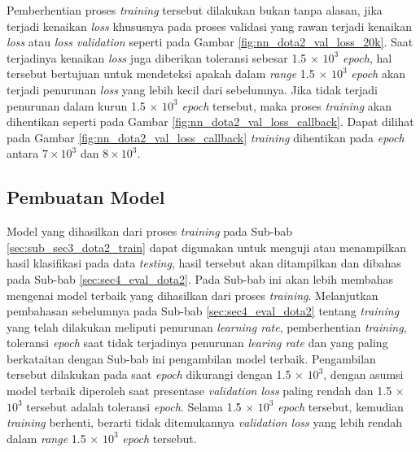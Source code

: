 Pemberhentian proses \textit{training} tersebut dilakukan bukan tanpa alasan, jika terjadi kenaikan \textit{loss} khususnya pada proses validasi yang rawan terjadi kenaikan \textit{loss} atau \textit{loss validation} seperti pada Gambar \ref{fig:nn_dota2_val_loss_20k}. Saat terjadinya kenaikan \textit{loss} juga diberikan toleransi sebesar 1.5 $\times$ $10^{3}$ \textit{epoch}, hal tersebut bertujuan untuk mendeteksi apakah dalam \textit{range} 1.5 $\times$ $10^{3}$ \textit{epoch} akan terjadi penurunan \textit{loss} yang lebih kecil dari sebelumnya. Jika tidak terjadi penurunan dalam kurun 1.5 $\times$ $10^{3}$ \textit{epoch} tersebut, maka proses \textit{training} akan dihentikan seperti pada Gambar \ref{fig:nn_dota2_val_loss_callback}. Dapat dilihat pada Gambar \ref{fig:nn_dota2_val_loss_callback} \textit{training} dihentikan pada \textit{epoch} antara $7 \times 10^{3}$ dan $8 \times 10^{3}$.
\vspace{1ex}

\subsection{Pembuatan Model}
\label{sec:sub_sec3_dota2_model}
\vspace{1ex}

Model yang dihasilkan dari proses \textit{training} pada Sub-bab \ref{sec:sub_sec3_dota2_train} dapat digunakan untuk menguji atau menampilkan hasil klasifikasi pada data \textit{testing}, hasil tersebut akan ditampilkan dan dibahas pada Sub-bab \ref{sec:sec4_eval_dota2}. Pada Sub-bab ini akan lebih membahas mengenai model terbaik yang dihasilkan dari proses \textit{training}. Melanjutkan pembahasan sebelumnya pada Sub-bab \ref{sec:sec4_eval_dota2} tentang \textit{training} yang telah dilakukan meliputi penurunan \textit{learning rate}, pemberhentian \textit{training}, toleransi \textit{epoch} saat tidak terjadinya penurunan \textit{learing rate} dan yang paling berkataitan dengan Sub-bab ini pengambilan model terbaik. Pengambilan tersebut dilakukan pada saat \textit{epoch} dikurangi dengan 1.5 $\times$ $10^{3}$, dengan asumsi model terbaik diperoleh saat presentase \textit{validation loss} paling rendah dan 1.5 $\times$ $10^{3}$ tersebut adalah toleransi \textit{epoch}. Selama 1.5 $\times$ $10^{3}$ \textit{epoch} tersebut, kemudian \textit{training} berhenti, berarti tidak ditemukannya \textit{validation loss} yang lebih rendah dalam \textit{range} 1.5 $\times$ $10^{3}$ \textit{epoch} tersebut.
\vspace{1ex}

